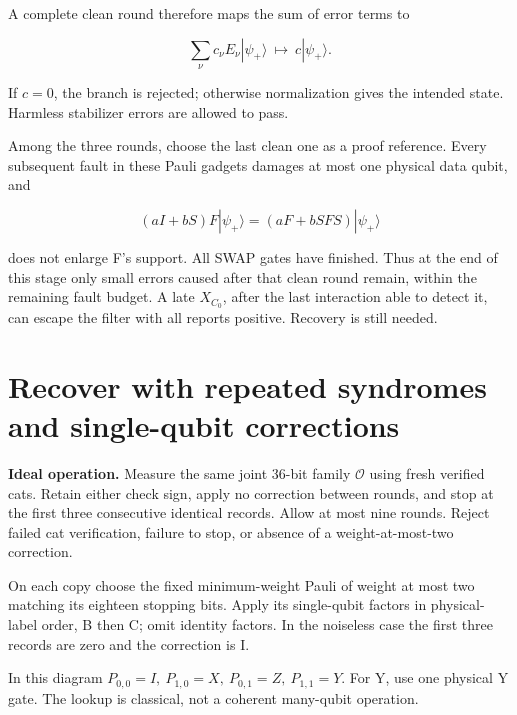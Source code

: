 \documentclass[11pt]{article}
\begin{document}
A complete clean round therefore maps the sum of error terms to

\[
\sum_\nu c_\nu E_\nu|\psi_+\rangle\ \longmapsto\ c|\psi_+\rangle.
\]

If \(c=0\), the branch is rejected; otherwise normalization gives the intended state. Harmless stabilizer errors are allowed to pass.

Among the three rounds, choose the last clean one as a proof reference. Every subsequent fault in these Pauli gadgets damages at most one physical data qubit, and

\[
(aI+bS)F|\psi_+\rangle=(aF+bSFS)|\psi_+\rangle
\]

does not enlarge F's support. All SWAP gates have finished. Thus at the end of this stage only small errors caused after that clean round remain, within the remaining fault budget. A late \(X_{C_0}\), after the last interaction able to detect it, can escape the filter with all reports positive. Recovery is still needed.

\section{Recover with repeated syndromes and single-qubit corrections}
\textbf{Ideal operation.} Measure the same joint 36-bit family \(\mathcal O\) using fresh verified cats. Retain either check sign, apply no correction between rounds, and stop at the first three consecutive identical records. Allow at most nine rounds. Reject failed cat verification, failure to stop, or absence of a weight-at-most-two correction.

On each copy choose the fixed minimum-weight Pauli of weight at most two matching its eighteen stopping bits. Apply its single-qubit factors in physical-label order, B then C; omit identity factors. In the noiseless case the first three records are zero and the correction is I.

\begin{center}\begin{minipage}{\linewidth}

\end{minipage}\end{center}

In this diagram \(P_{0,0}=I,\ P_{1,0}=X,\ P_{0,1}=Z,\ P_{1,1}=Y\). For Y, use one physical Y gate. The lookup is classical, not a coherent many-qubit operation.
\end{document}
